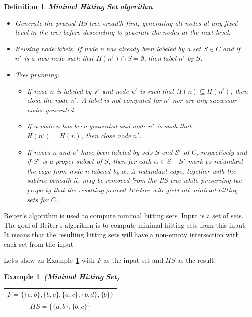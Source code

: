\documentclass[12pt,a4paper]{article}
\newtheorem{definition}{Definition}[subsection]
\newtheorem{example}{Example}[subsection]
\begin{document}
\begin{definition}{\textbf{Minimal Hitting Set algorithm}}{\indent}
	\label{def:mhs}
	\begin{itemize}
		\item Generate the pruned HS-tree breadth-first, generating all nodes at any fixed level in the tree before descending to generate the nodes at the next level.
		
		\item Reusing node labels: If node $n$ has already been labeled by a set $S \in C$ and if $n'$ is a new node such that $H(n') \cap S = \emptyset$, then label $n'$ by $S$.
		
		\item Tree prunning:
		
		\begin{itemize}
			\item If node $n$ is labeled by $\checkmark$ and node $n'$ is such that $H(n) \subseteq H(n')$, then close the node $n'$. A label is not computed for $n'$ nor are any successor nodes generated.
			
			\item If a node $n$ has been generated and node $n'$ is such that $H(n') = H(n)$, then close node $n'$.
			
			\item If nodes $n$ and $n'$ have been labeled by sets $S$ and $S'$ of $C$, respectively and if $S'$ is a proper subset of $S$, then for each $\alpha \in S - S'$ mark as redundant the edge from node $n$ labeled by $\alpha$. A redundant edge, together with the subtree beneath it, may be removed from the HS-tree while preserving the property that the resulting pruned HS-tree will yield all minimal hitting sets for $C$.
			
		\end{itemize}	
		
	\end{itemize}
	
\end{definition}

Reiter's algorithm is used to compute minimal hitting sets. Input is a set of sets. The goal of Reiter's algorithm is to compute minimal hitting sets from this input. It means that the resulting hitting sets will have a non-empty intersection with each set from the input.

Let's show an Example~\ref{example:mhs} with $F$ as the input set and $HS$ as the result.

\begin{example}{\textbf{(Minimal Hitting Set)}}
	\label{example:mhs}
	\begin{table}[H]
		\centering
		\begin{tabular}{c}
			$ F = \{ \{a,b\}, \{b,c\}, \{a,c\}, \{b,d\}, \{b\} \} $ \\
			\addlinespace[0.4cm]
			$ HS = \{ \{a,b\}, \{b,c\} \} $
		\end{tabular}
	\end{table}
\end{example}
\end{document}
